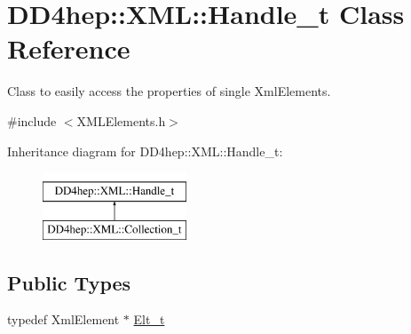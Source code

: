 \hypertarget{class_d_d4hep_1_1_x_m_l_1_1_handle__t}{}\section{D\+D4hep\+:\+:X\+ML\+:\+:Handle\+\_\+t Class Reference}
\label{class_d_d4hep_1_1_x_m_l_1_1_handle__t}


Class to easily access the properties of single Xml\+Elements.  




{\ttfamily \#include $<$X\+M\+L\+Elements.\+h$>$}

Inheritance diagram for D\+D4hep\+:\+:X\+ML\+:\+:Handle\+\_\+t\+:\begin{figure}[H]
\begin{center}
\leavevmode
\includegraphics[height=2.000000cm]{class_d_d4hep_1_1_x_m_l_1_1_handle__t}
\end{center}
\end{figure}
\subsection*{Public Types}
\begin{DoxyCompactItemize}
\item 
typedef Xml\+Element $\ast$ \hyperlink{class_d_d4hep_1_1_x_m_l_1_1_handle__t_a81a72155f29971b37652430a334a6b30}{Elt\+\_\+t}
\end{DoxyCompactItemize}
